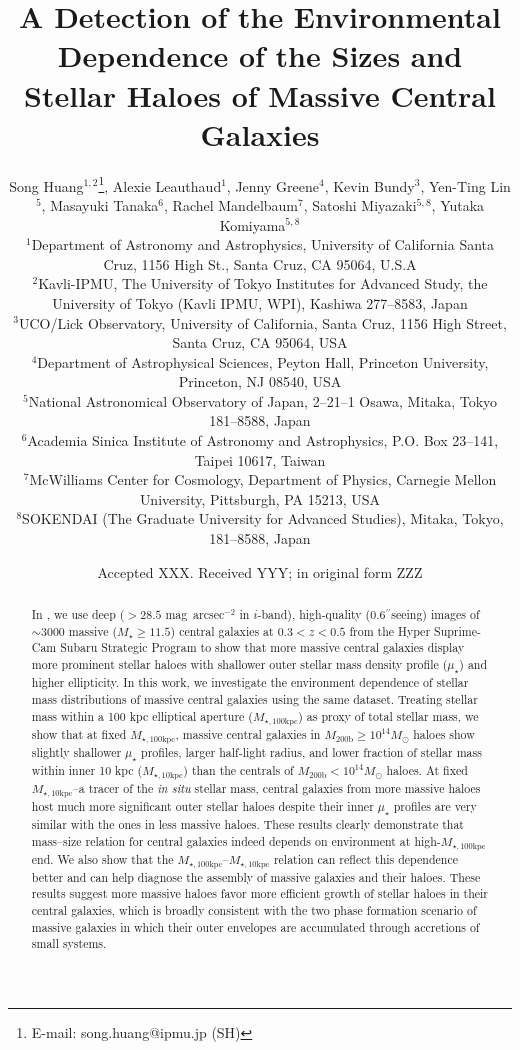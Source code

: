 \documentclass[a4paper,fleqn,usenatbib]{mnras}
\title[Structure and Environment of Massive Galaxies]{
       A Detection of the Environmental Dependence of the Sizes and Stellar Haloes
       of Massive Central Galaxies}
\author[S. Huang et al.]{
        Song Huang$^{1,2}$\thanks{E-mail: song.huang@ipmu.jp (SH)},
        Alexie Leauthaud$^{1}$,
        Jenny Greene$^{4}$,
        Kevin Bundy$^{3}$,
        \newauthor
        Yen-Ting Lin$^{5}$,
        Masayuki Tanaka$^{6}$,
        Rachel Mandelbaum$^{7}$,
        Satoshi Miyazaki$^{5,8}$,
        \newauthor
        Yutaka Komiyama$^{5,8}$
        \\
        $^{1}$Department of Astronomy and Astrophysics, University of California 
              Santa Cruz, 1156 High St., Santa Cruz, CA 95064, U.S.A\\
        $^{2}$Kavli-IPMU, The University of Tokyo Institutes for Advanced Study, 
              the University of Tokyo (Kavli IPMU, WPI), Kashiwa 277--8583, Japan\\              
        $^{3}$UCO/Lick Observatory, University of California, Santa Cruz,
              1156 High Street, Santa Cruz, CA 95064, USA\\
        $^{4}$Department of Astrophysical Sciences, Peyton Hall,
              Princeton University, Princeton, NJ 08540, USA \\
        $^{5}$National Astronomical Observatory of Japan, 2--21--1 Osawa, Mitaka, 
              Tokyo 181--8588, Japan\\
        $^{6}$Academia Sinica Institute of Astronomy and Astrophysics, 
              P.O. Box 23--141, Taipei 10617, Taiwan\\
        $^{7}$McWilliams Center for Cosmology, Department of Physics, 
              Carnegie Mellon University, Pittsburgh, PA 15213, USA\\
        $^{8}$SOKENDAI (The Graduate University for Advanced Studies), Mitaka,
              Tokyo, 181--8588, Japan
        }
\date{Accepted XXX. Received YYY; in original form ZZZ}
\def\asec{$^{\prime\prime}$}
\def\sb{mag~arcsec$^{-2}$}
\def\msun{$M_\odot$}
\def\mstar{{$M_{\star}$}}
\def\mhalo{{$M_{\mathrm{200b}}$}}
\def\minn{{$M_{\star,10\mathrm{kpc}}$}}
\def\mtot{{$M_{\star,100\mathrm{kpc}}$}}
\def\mden{{$\mu_{\star}$}}
\begin{document}
\label{firstpage}
\pagerange{\pageref{firstpage}--\pageref{lastpage}}

\maketitle


\begin{abstract} 
    
    In \citet{hscMassiveI}, we use deep ($>28.5$ \sb{} in $i$-band), high-quality 
    (0.6\asec seeing) images of ${\sim}3000$ massive (\mstar{}$\geq 11.5$) central 
    galaxies at $0.3 < z < 0.5$ from the Hyper Suprime-Cam Subaru Strategic Program 
    to show that more massive central galaxies display more prominent stellar haloes 
    with shallower outer stellar mass density profile (\mden) and higher ellipticity. 
    In this work, we investigate the environment dependence of stellar mass 
    distributions of massive central galaxies using the same dataset.
    Treating stellar mass within a 100 kpc elliptical aperture (\mtot{}) as proxy of 
    total stellar mass, we show that at fixed \mtot{}, massive central galaxies in 
    \mhalo{}$\geq 10^{14}$\msun{} haloes show slightly shallower \mden{} profiles, 
    larger half-light radius, and lower fraction of stellar mass within inner 10 kpc 
    (\minn{}) than the centrals of \mhalo{}$< 10^{14}$\msun{} haloes. 
    At fixed \minn{}--a tracer of the \textit{in situ} stellar mass, central galaxies 
    from more massive haloes host much more significant outer stellar haloes despite 
    their inner \mden{} profiles are very similar with the ones in less massive haloes.
    These results clearly demonstrate that mass--size relation for central galaxies 
    indeed depends on environment at high-\mtot{} end. 
    We also show that the \mtot{}--\minn{} relation can reflect this dependence 
    better and can help diagnose the assembly of massive galaxies and their haloes.
    These results suggest more massive haloes favor more efficient growth of stellar 
    haloes in their central galaxies, which is broadly consistent with the two phase 
    formation scenario of massive galaxies in which their outer envelopes are 
    accumulated through accretions of small systems. 
    
\end{abstract}
\end{document}
